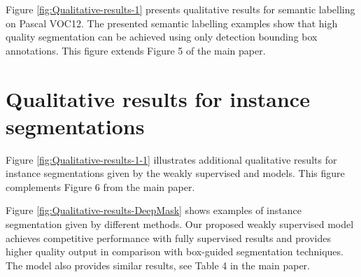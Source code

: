 \documentclass[10pt,english,british,twocolumn]{article}
\begin{document}
Figure \ref{fig:Qualitative-results-1} presents qualitative results
for semantic labelling on Pascal VOC12. The presented semantic labelling
examples show that high quality segmentation can be achieved using
only detection bounding box annotations. This figure extends Figure
5 of the main paper.

\section{\label{sec:Qualitative-results-for-1}Qualitative results for instance
segmentations}

Figure \ref{fig:Qualitative-results-1-1} illustrates additional qualitative
results for instance segmentations given by the weakly supervised
 and  models. This figure
complements Figure 6 from the main paper.

Figure \ref{fig:Qualitative-results-DeepMask} shows examples of instance
segmentation given by different methods. Our proposed weakly supervised
 model achieves competitive performance with fully
supervised results and provides higher quality output in comparison
with box-guided segmentation techniques. The 
model also provides similar results, see Table 4 in the main paper.
\end{document}
